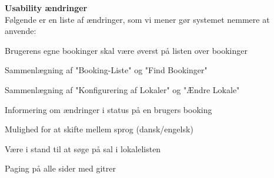 \textbf{Usability ændringer}
\\Følgende er en liste af ændringer, som vi mener gør systemet nemmere at anvende:
\begin{my_itemize}
\item Brugerens egne bookinger skal være øverst på listen over bookinger
\item Sammenlægning af "Booking-Liste" og "Find Bookinger"
\item Sammenlægning af "Konfigurering af Lokaler" og "Ændre Lokale"
\item Informering om ændringer i status på en brugers booking
\item Mulighed for at skifte mellem sprog (dansk/engelsk)
\item Være i stand til at søge på sal i lokalelisten
\item Paging på alle sider med gitrer
\end{my_itemize}
